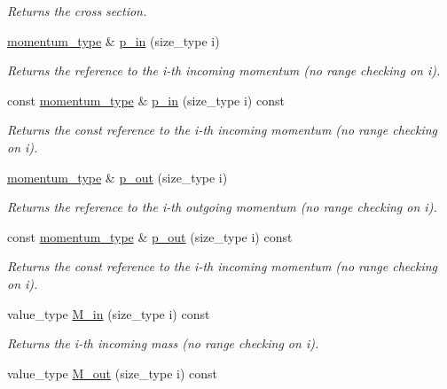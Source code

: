 \begin{DoxyCompactItemize}
\begin{DoxyCompactList}\small\item\em Returns the cross section. \end{DoxyCompactList}\item 
\hyperlink{a00579}{momentum\+\_\+type} \& \hyperlink{a00450_a088d3c3937abd672371420b0001a44f3}{p\+\_\+in} (size\+\_\+type i)
\begin{DoxyCompactList}\small\item\em Returns the reference to the i-\/th incoming momentum (no range checking on i). \end{DoxyCompactList}\item 
const \hyperlink{a00579}{momentum\+\_\+type} \& \hyperlink{a00450_a8a5e9271352f7631ce0652c22634cbfe}{p\+\_\+in} (size\+\_\+type i) const 
\begin{DoxyCompactList}\small\item\em Returns the const reference to the i-\/th incoming momentum (no range checking on i). \end{DoxyCompactList}\item 
\hyperlink{a00579}{momentum\+\_\+type} \& \hyperlink{a00450_abf9dd4563f40b5e2912e085b9b9b5f48}{p\+\_\+out} (size\+\_\+type i)
\begin{DoxyCompactList}\small\item\em Returns the reference to the i-\/th outgoing momentum (no range checking on i). \end{DoxyCompactList}\item 
const \hyperlink{a00579}{momentum\+\_\+type} \& \hyperlink{a00450_a13237d14de63e18b80517e1b1c88e7cb}{p\+\_\+out} (size\+\_\+type i) const 
\begin{DoxyCompactList}\small\item\em Returns the const reference to the i-\/th incoming momentum (no range checking on i). \end{DoxyCompactList}\item 
\hypertarget{a00450_af9293b92caee4fa9035e89dcfbbbcae5}{}value\+\_\+type \hyperlink{a00450_af9293b92caee4fa9035e89dcfbbbcae5}{M\+\_\+in} (size\+\_\+type i) const \label{a00450_af9293b92caee4fa9035e89dcfbbbcae5}

\begin{DoxyCompactList}\small\item\em Returns the i-\/th incoming mass (no range checking on i). \end{DoxyCompactList}\item 
\hypertarget{a00450_a959183c12a67b2e4428b5257b7c13ebf}{}value\+\_\+type \hyperlink{a00450_a959183c12a67b2e4428b5257b7c13ebf}{M\+\_\+out} (size\+\_\+type i) const \label{a00450_a959183c12a67b2e4428b5257b7c13ebf}


\end{DoxyCompactItemize}

